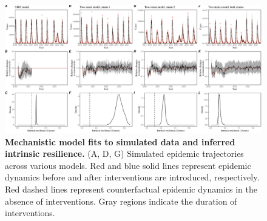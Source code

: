\documentclass[12pt]{article}
\begin{document}
\begin{figure}[!th]
\includegraphics[width=\textwidth]{../figure_fit/figure_fit.pdf}
\caption{
\textbf{Mechanistic model fits to simulated data and inferred intrinsic resilience.}
(A, D, G) Simulated epidemic trajectories across various models. 
Red and blue solid lines represent epidemic dynamics before and after interventions are introduced, respectively.
Red dashed lines represent counterfactual epidemic dynamics in the absence of interventions.
Gray regions indicate the duration of interventions.
}
\end{figure}

\pagebreak


\end{document}
